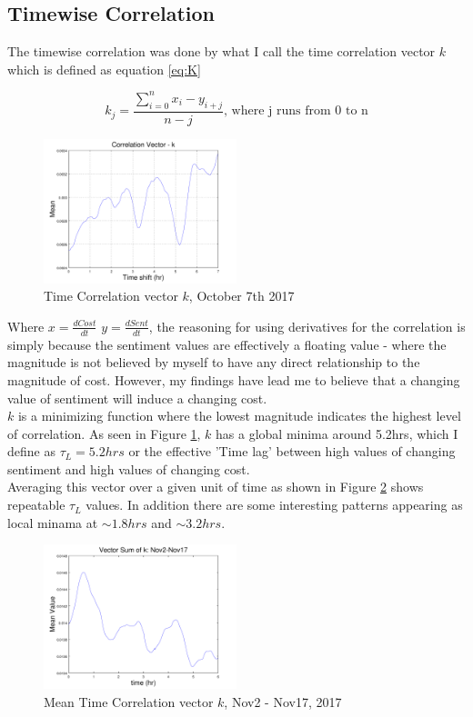 \documentclass[12pt,journal,compsoc]{IEEEtran}
\begin{document}
\subsection{Timewise Correlation}
The timewise correlation was done by what I call the time correlation vector $k$ which is defined as equation \ref{eq:K}

\begin{equation}\label{eq:K}
k_j = \frac{\sum\limits_{i=0}^n x_i - y_{i+j}}{n-j} \textrm{, where j runs from 0 to n}
\end{equation}

\begin{figure}[h]
	\centering
	\includegraphics[width=0.5\textwidth]{../Datasets/Plots/Oct7_K}
	\caption{Time Correlation vector $k$, October 7th 2017}
	\label{fig:K}
\end{figure}

Where $x = \frac{dCost}{dt}$ $y = \frac{dSent}{dt}$, the reasoning for using derivatives for the correlation is simply because
the sentiment values are effectively a floating value - where the magnitude is not believed by myself to have any direct 
relationship to the magnitude of cost. However, my findings have lead me to believe that a changing value of sentiment
will induce a changing cost.\\

$k$ is a minimizing function where the lowest magnitude indicates the highest level of correlation.
As seen in Figure \ref{fig:K}, $k$ has a global minima around 5.2hrs, which I define as $\tau_L = 5.2hrs$ 
or the effective 'Time lag' between high values of changing sentiment and high values of changing cost.\\

Averaging this vector over a given unit of time as shown in Figure \ref{fig:Ksum} shows repeatable $\tau_L$ values. 
In addition there are some interesting patterns appearing as local minama at $\sim1.8hrs$ and $\sim3.2hrs$.

\begin{figure}[h]
	\centering
	\includegraphics[width=0.5\textwidth]{../Datasets/Plots/VectorSumk}
	\caption{Mean Time Correlation vector $k$, Nov2 - Nov17, 2017}
	\label{fig:Ksum}
\end{figure}
\end{document}
